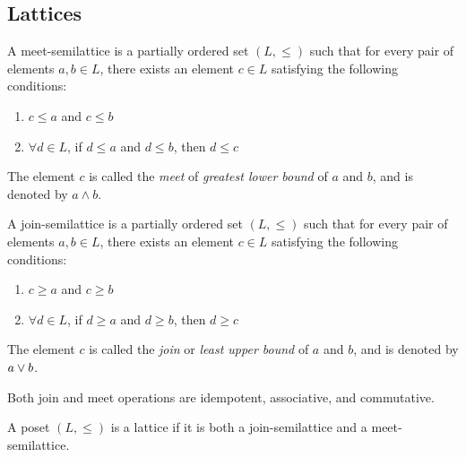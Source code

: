 \documentclass[
  10pt,       %
  twoside,    %
  a4paper,    %
  english,    %
  tikz,       %
  openright,  %
]{book}
\begin{document}
\subsection{Lattices}

\begin{definition}
  A meet-semilattice is a partially ordered set \((L, \leq)\) such that for
  every pair of elements \(a, b \in L\), there exists an element \(c \in L\)
  satisfying the following conditions: 
  \begin{enumerate}
    \item \(c \leq a\) and \(c \leq b\) 
    \item \(\forall d \in L\), if \(d \leq a\) and \(d \leq b\), then \(d \leq c\) 
\end{enumerate}
  The element \(c\) is called the \emph{meet} of \emph{greatest lower bound} of
  \(a\) and \(b\), and is denoted by \(a \wedge b\).
\end{definition}

\begin{definition}
  A join-semilattice is a partially ordered set \((L, \leq)\) such that for
  every pair of elements \(a, b \in L\), there exists an element \(c \in L\)
  satisfying the following conditions: 
  \begin{enumerate}
    \item \(c \geq a\) and \(c \geq b\) 
    \item \(\forall d \in L\), if \(d \geq a\) and \(d \geq b\), then \(d \geq c\) 
\end{enumerate}
  The element \(c\) is called the \emph{join} or \emph{least upper bound} of
  \(a\) and \(b\), and is denoted by \(a \lor b\).
\end{definition}

\begin{observation}
  Both join and meet operations are idempotent, associative, and commutative.
\end{observation}

\begin{definition}[Lattice]
  A poset $(L, \leq)$ is a lattice if it is both a join-semilattice and a 
  meet-semilattice.
\end{definition}
\end{document}
